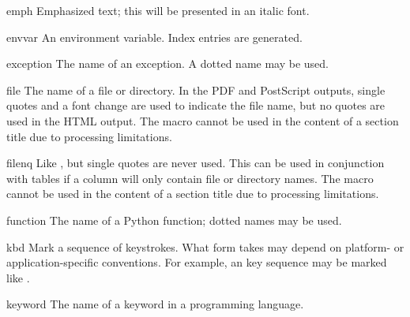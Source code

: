 \documentclass{howto}
\begin{document}
    \begin{macrodesc}{emph}{}
      Emphasized text; this will be presented in an italic font.
    \end{macrodesc}

    \begin{macrodesc}{envvar}{}
      An environment variable.  Index entries are generated.
    \end{macrodesc}

    \begin{macrodesc}{exception}{}
      The name of an exception.  A dotted name may be used.
    \end{macrodesc}

    \begin{macrodesc}{file}{}
      The name of a file or directory.  In the PDF and PostScript
      outputs, single quotes and a font change are used to indicate
      the file name, but no quotes are used in the HTML output.
       The  macro cannot be used in the
      content of a section title due to processing limitations.
    \end{macrodesc}

    \begin{macrodesc}{filenq}{}
      Like , but single quotes are never used.  This can
      be used in conjunction with tables if a column will only contain 
      file or directory names.
       The  macro cannot be used in the
      content of a section title due to processing limitations.
    \end{macrodesc}

    \begin{macrodesc}{function}{}
      The name of a Python function; dotted names may be used.
    \end{macrodesc}

    \begin{macrodesc}{kbd}{}
      Mark a sequence of keystrokes.  What form 
      takes may depend on platform- or application-specific
      conventions.  For example, an  key sequence
      may be marked like .
    \end{macrodesc}

    \begin{macrodesc}{keyword}{}
      The name of a keyword in a programming language.
    \end{macrodesc}
\end{document}
